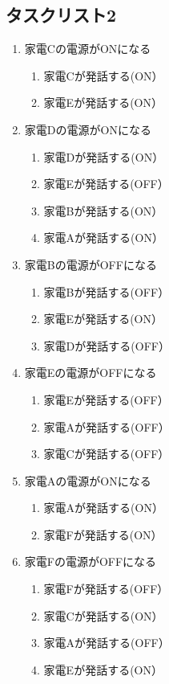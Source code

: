 \documentclass[a4j,12pt,twoside]{jreport}
\begin{document}
\subsection*{タスクリスト2}
\begin{multicols}{2}
	\begin{enumerate}
		\item 家電Cの電源がONになる
		\begin{enumerate}
			\item 家電Cが発話する(ON）
			\item 家電Eが発話する(ON）
		\end{enumerate}
		
		\item 家電Dの電源がONになる
		\begin{enumerate}
			\item 家電Dが発話する(ON）
			\item 家電Eが発話する(OFF）
			\item 家電Bが発話する(ON）
			\item 家電Aが発話する(ON）
		\end{enumerate}	
			
		\item 家電Bの電源がOFFになる
		\begin{enumerate}
			\item 家電Bが発話する(OFF）
			\item 家電Eが発話する(ON）
			\item 家電Dが発話する(OFF）
		\end{enumerate}
	
		\item 家電Eの電源がOFFになる
		\begin{enumerate}
			\item 家電Eが発話する(OFF）		
			\item 家電Aが発話する(OFF）
			\item 家電Cが発話する(OFF）
		\end{enumerate}
		
		\item 家電Aの電源がONになる
		\begin{enumerate}
			\item 家電Aが発話する(ON）
			\item 家電Fが発話する(ON）
		\end{enumerate}	
		
		\item 家電Fの電源がOFFになる
		\begin{enumerate}
			\item 家電Fが発話する(OFF）
			\item 家電Cが発話する(ON）
			\item 家電Aが発話する(OFF）
			\item 家電Eが発話する(ON）	
		\end{enumerate}	
		

\end{enumerate}
\end{multicols}
\end{document}
